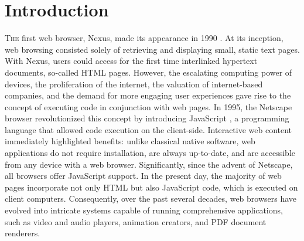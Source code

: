 
\chapter{Introduction}
\label{Intro}



\lettrine[lines=3]{T}{he} first web browser, Nexus, made its appearance in 1990 \cite{nexus}.  
At its inception, web browsing consisted solely of retrieving and displaying small, static text pages. 
With Nexus, users could access for the first time interlinked hypertext documents, so-called HTML pages. 
However, the escalating computing power of devices, the proliferation of the internet, the valuation of internet-based companies, and the demand for more engaging user experiences gave rise to the concept of executing code in conjunction with web pages. 
In 1995, the Netscape browser revolutionized this concept by introducing JavaScript \cite{10.1007/978-3-642-14107-2_7}, a programming language that allowed code execution on the client-side.
Interactive web content immediately highlighted benefits: unlike classical native software, web applications do not require installation, are always up-to-date, and are accessible from any device with a web browser. 
Significantly, since the advent of Netscape, all browsers offer JavaScript support. 
In the present day, the majority of web pages incorporate not only HTML but also JavaScript code, which is executed on client computers. 
Consequently, over the past several decades, web browsers have evolved into intricate systems capable of running comprehensive applications, such as video and audio players, animation creators, and PDF document renderers.


